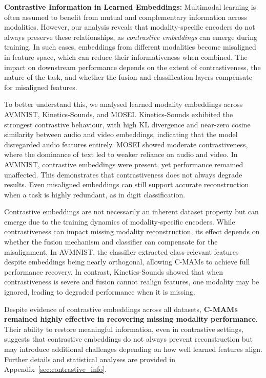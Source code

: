 \textbf{Contrastive Information in Learned Embeddings: } Multimodal learning is often assumed to benefit from mutual and complementary information across modalities. However, our analysis reveals that modality-specific encoders do not always preserve these relationships, as \textit{contrastive embeddings} can emerge during training. In such cases, embeddings from different modalities become misaligned in feature space, which can reduce their informativeness when combined. The impact on downstream performance depends on the extent of contrastiveness, the nature of the task, and whether the fusion and classification layers compensate for misaligned features.

To better understand this, we analysed learned modality embeddings across AVMNIST, Kinetics-Sounds, and MOSEI. Kinetics-Sounds exhibited the strongest contrastive behaviour, with high KL divergence and near-zero cosine similarity between audio and video embeddings, indicating that the model disregarded audio features entirely. MOSEI showed moderate contrastiveness, where the dominance of text led to weaker reliance on audio and video. In AVMNIST, contrastive embeddings were present, yet performance remained unaffected. This demonstrates that contrastiveness does not always degrade results. Even misaligned embeddings can still support accurate reconstruction when a task is highly redundant, as in digit classification.

Contrastive embeddings are not necessarily an inherent dataset property but can emerge due to the training dynamics of modality-specific encoders. While contrastiveness can impact missing modality reconstruction, its effect depends on whether the fusion mechanism and classifier can compensate for the misalignment. In AVMNIST, the classifier extracted class-relevant features despite embeddings being nearly orthogonal, allowing C-MAMs to achieve full performance recovery. In contrast, Kinetics-Sounds showed that when contrastiveness is severe and fusion cannot realign features, one modality may be ignored, leading to degraded performance when it is missing.

Despite evidence of contrastive embeddings across all datasets, \textbf{C-MAMs remained highly effective in recovering missing modality performance}. Their ability to restore meaningful information, even in contrastive settings, suggests that contrastive embeddings do not always prevent reconstruction but may introduce additional challenges depending on how well learned features align. Further details and statistical analyses are provided in Appendix~\ref{sec:contrastive_info}.

